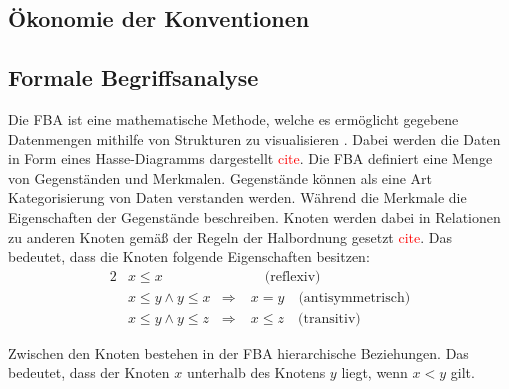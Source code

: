 

\subsection{Ökonomie der Konventionen}

\subsection{Formale Begriffsanalyse}
Die \ac{FBA} ist eine mathematische Methode, welche es ermöglicht gegebene Datenmengen mithilfe von Strukturen zu visualisieren \cite{formale-begriffsanalyse}.
Dabei werden die Daten in Form eines Hasse-Diagramms dargestellt \textcolor{red}{cite}.
Die \ac{FBA} definiert eine Menge von Gegenständen und Merkmalen.
Gegenstände können als eine Art Kategorisierung von Daten verstanden werden.
Während die Merkmale die Eigenschaften der Gegenstände beschreiben.
Knoten werden dabei in Relationen zu anderen Knoten gemäß der Regeln der Halbordnung gesetzt \textcolor{red}{cite}.
Das bedeutet, dass die Knoten folgende Eigenschaften besitzen:
\begin{alignat*}{2}
     & x\leq x              &                & \quad\text{(reflexiv)}            \\ %
     & x\leq y\land y\leq x & \Rightarrow \; & x=y \quad\text{(antisymmetrisch)} \\
     & x\leq y\land y\leq z & \Rightarrow \; & x\leq z \quad\text{(transitiv)}
\end{alignat*}

Zwischen den Knoten bestehen in der \ac{FBA} hierarchische Beziehungen.
Das bedeutet, dass der Knoten $x$ unterhalb des Knotens $y$ liegt, wenn $x < y$ gilt. %


